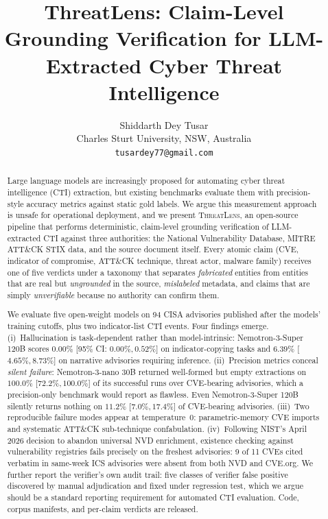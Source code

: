 \documentclass[10pt,twocolumn]{article}
\title{\bf ThreatLens: Claim-Level Grounding Verification for
LLM-Extracted Cyber Threat Intelligence}
\author{
Shiddarth Dey Tusar
\\ \small Charles Sturt University, NSW, Australia
\\ \small \texttt{tusardey77@gmail.com}
}
\date{}
\newcommand{\tool}{\textsc{ThreatLens}\xspace}
\begin{document}
\maketitle

\begin{abstract}
Large language models are increasingly proposed for automating cyber threat
intelligence (CTI) extraction, but existing benchmarks evaluate them with
precision-style accuracy metrics against static gold labels. We argue this
measurement approach is unsafe for operational deployment, and we present
\tool, an open-source pipeline that performs deterministic, claim-level
grounding verification of LLM-extracted CTI against three authorities: the
National Vulnerability Database, MITRE ATT\&CK STIX data, and the source
document itself. Every atomic claim (CVE, indicator of compromise, ATT\&CK
technique, threat actor, malware family) receives one of five verdicts under a
taxonomy that separates \emph{fabricated} entities from entities that are real
but \emph{ungrounded} in the source, \emph{mislabeled} metadata, and claims
that are simply \emph{unverifiable} because no authority can confirm them.

We evaluate five open-weight models on 94 CISA advisories published after the
models' training cutoffs, plus two indicator-list CTI events. Four findings
emerge. (i)~Hallucination is task-dependent rather than model-intrinsic: Nemotron-3-Super 120B
scores $0.00\%$ [95\% CI: $0.00\%, 0.52\%$] on indicator-copying tasks and $6.39\%$ [$4.65\%, 8.73\%$] on narrative
advisories requiring inference. (ii)~Precision metrics conceal
\emph{silent failure}: Nemotron-3-nano 30B returned well-formed but empty extractions on
$100.0\%$ [$72.2\%, 100.0\%$] of its successful runs over CVE-bearing advisories, which a
precision-only benchmark would report as flawless. Even Nemotron-3-Super 120B silently
returns nothing on $11.2\%$ [$7.0\%, 17.4\%$] of CVE-bearing advisories. (iii)~Two reproducible
failure modes appear at temperature~0: parametric-memory CVE imports and
systematic ATT\&CK sub-technique confabulation. (iv)~Following NIST's April 2026
decision to abandon universal NVD enrichment, existence checking against
vulnerability registries fails precisely on the freshest advisories: 9 of 11
CVEs cited verbatim in same-week ICS advisories were absent from both NVD and
CVE.org. We further report the verifier's own audit trail: five classes of
verifier false positive discovered by manual adjudication and fixed under
regression test, which we argue should be a standard reporting requirement for
automated CTI evaluation. Code, corpus manifests, and per-claim verdicts are
released.
\end{abstract}
\end{document}
